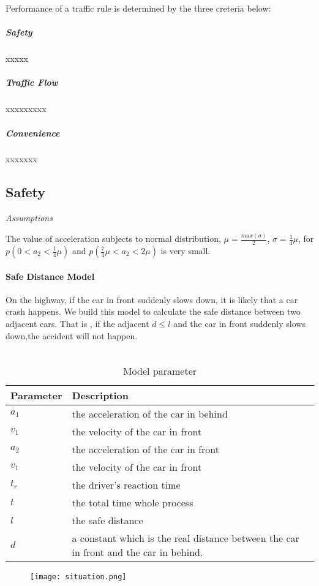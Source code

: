 Performance of a traffic rule is determined by the three 
creteria below: 
\subparagraph{Safety} xxxxx
\subparagraph{Traffic Flow} xxxxxxxxx
\subparagraph{Convenience} xxxxxxx

\subsection{Safety}
\emph{Assumptions}

The value of acceleration subjects to normal distribution, $\mu = \frac{max(a)}{2}$,
$\sigma = \frac{1}{4}\mu$, for $p(0 < a_2 < \frac{1}{4} \mu)$ and $p(\frac{7}{4} \mu < a_2 < 2\mu)$ is very small.

\paragraph{Safe Distance Model}

On the highway, if the car in front suddenly slows down, it is likely that a car crash happens.
We build this model to calculate the safe distance between two adjacent cars. That is ,
if the adjacent $d \leq l$ and the car in front suddenly slows down,the accident will not happen.\\ \\
\begin{table}
\centering
\begin{tabular}{ll}
\hline
Parameter & Description\\
\hline
$a_1$ & the acceleration of the  car in behind \\
$v_1$ & the velocity of the  car in front \\
$a_2$ & the acceleration of the car in front \\
$v_1$ & the velocity of the  car in front \\
$t_r$ & the driver's reaction time \\
$t$ & the total time whole process \\
$l$ & the safe distance \\
$d$ & a constant which is the real distance between the car in front and the car in behind.\\
\hline
\end{tabular}
\caption{Model parameter}
\end{table}

\begin{figure}[h]
\small
\centering
\texttt{[image: situation.png]}
\caption{} %
\end{figure}

